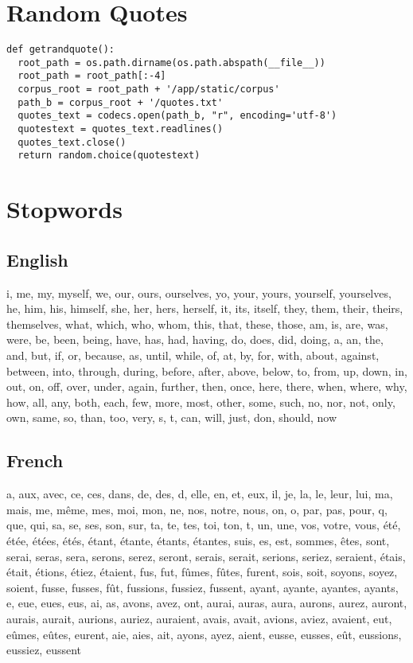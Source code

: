 \section{Random Quotes}

\begin{verbatim}
def getrandquote():
  root_path = os.path.dirname(os.path.abspath(__file__))
  root_path = root_path[:-4]
  corpus_root = root_path + '/app/static/corpus'
  path_b = corpus_root + '/quotes.txt'
  quotes_text = codecs.open(path_b, "r", encoding='utf-8')
  quotestext = quotes_text.readlines()
  quotes_text.close()
  return random.choice(quotestext)
\end{verbatim}


\section{Stopwords}
\label{s:stopwords}


\subsection{English}
 
i, me, my, myself, we, our, ours, ourselves, yo, your, yours, yourself, yourselves, he, him, his, himself, she, her, hers, herself, it, its, itself, they, them, their, theirs, themselves, what, which, who, whom, this, that, these, those, am, is, are, was, were, be, been, being, have, has, had, having, do, does, did, doing, a, an, the, and, but, if, or, because, as, until, while, of, at, by, for, with, about, against, between, into, through, during, before, after, above, below, to, from, up, down, in, out, on, off, over, under, again, further, then, once, here, there, when, where, why, how, all, any, both, each, few, more, most, other, some, such, no, nor, not, only, own, same, so, than, too, very, s, t, can, will, just, don, should, now


\subsection{French}

a, aux, avec, ce, ces, dans, de, des, d, elle, en, et, eux, il, je, la, le, leur, lui, ma, mais, me, m{\^e}me, mes, moi, mon, ne, nos, notre, nous, on, o, par, pas, pour, q, que, qui, sa, se, ses, son, sur, ta, te, tes, toi, ton, t, un, une, vos, votre, vous, {\'e}t{\'e}, {\'e}t{\'e}e, {\'e}t{\'e}es, {\'e}t{\'e}s, {\'e}tant, {\'e}tante, {\'e}tants, {\'e}tantes, suis, es, est, sommes, {\^e}tes, sont, serai, seras, sera, serons, serez, seront, serais, serait, serions, seriez, seraient, {\'e}tais, {\'e}tait, {\'e}tions, {\'e}tiez, {\'e}taient, fus, fut, f{\^u}mes, f{\^u}tes, furent, sois, soit, soyons, soyez, soient, fusse, fusses, f{\^u}t, fussions, fussiez, fussent, ayant, ayante, ayantes, ayants, e, eue, eues, eus, ai, as, avons, avez, ont, aurai, auras, aura, aurons, aurez, auront, aurais, aurait, aurions, auriez, auraient, avais, avait, avions, aviez, avaient, eut, e{\^u}mes, e{\^u}tes, eurent, aie, aies, ait, ayons, ayez, aient, eusse, eusses, e{\^u}t, eussions, eussiez, eussent


